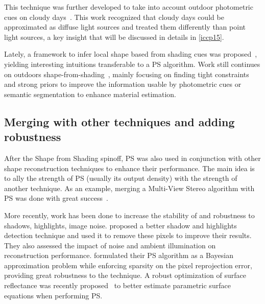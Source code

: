 This technique was further developed to take into account outdoor photometric cues on cloudy days~\cite{Langer1994}. This work recognized that cloudy days could be approximated as diffuse light sources and treated them differently than point light sources, a key insight that will be discussed in details in \ref{iccp15}.

Lately, a framework to infer local shape based from shading cues was proposed~\cite{Xiong2013}, yielding interesting intuitions transferable to a PS algorithm. Work still continues on outdoors shape-from-shading~\cite{oxholm-eccv-12,johnson-cvpr-11,barron-pami-15}, mainly focusing on finding tight constraints and strong priors to improve the information usable by photometric cues or semantic segmentation to enhance material estimation.

\subsection{Merging with other techniques and adding robustness}
After the Shape from Shading spinoff, PS was also used in conjunction with other shape reconstruction techniques to enhance their performance. The main idea is to ally the strength of PS (usually its output density) with the strength of another technique. As an example, merging a Multi-View Stereo algorithm with PS was done with great success~\cite{HernandezEsteban2008}.

More recently, work has been done to increase the stability of and robustness to shadows, highlights, image noise. \cite{BarskyPetrou-pami-2003} proposed a better shadow and highlights detection technique and used it to remove these pixels to improve their results. They also assessed the impact of noise and ambient illumination on reconstruction performance. \cite{ikehata-cvpr-12} formulated their PS algorithm as a Bayesian approximation problem while enforcing sparsity on the pixel reprojection error, providing great robustness to the technique. A robust optimization of surface reflectance was recently proposed~\cite{ikehata-cvpr-14} to better estimate parametric surface equations when performing PS.

